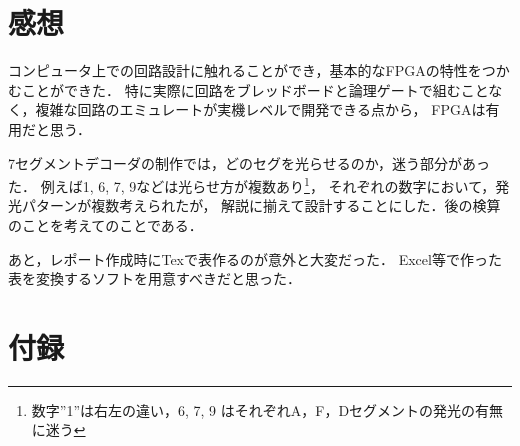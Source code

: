 \section{感想}
コンピュータ上での回路設計に触れることができ，基本的なFPGAの特性をつかむことができた．
特に実際に回路をブレッドボードと論理ゲートで組むことなく，複雑な回路のエミュレートが実機レベルで開発できる点から，
FPGAは有用だと思う．

7セグメントデコーダの制作では，どのセグを光らせるのか，迷う部分があった．
例えば1, 6, 7, 9などは光らせ方が複数あり\footnote{数字''1''は右左の違い，6, 7, 9 はそれぞれA，F，Dセグメントの発光の有無に迷う}，
それぞれの数字において，発光パターンが複数考えられたが，
解説に揃えて設計することにした．後の検算のことを考えてのことである．

あと，レポート作成時にTexで表作るのが意外と大変だった．
Excel等で作った表を変換するソフトを用意すべきだと思った．

\clearpage
\section{付録}


